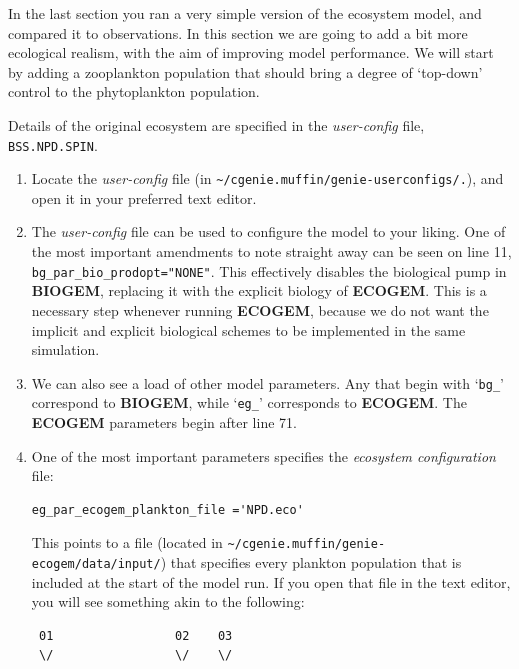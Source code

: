 \documentclass[11pt,fleqn]{book} %
\begin{document}
In the last section you ran a very simple version of the ecosystem model, and compared it to observations. In this section we are going to add a bit more ecological realism, with the aim of improving model performance. We will start by adding a zooplankton population that  should bring a degree of `top-down' control to the phytoplankton population. 
\vspace{2mm}

Details of the original ecosystem are specified in the \textit{user-config} file, \texttt{BSS.NPD.SPIN}.

\vspace{2mm}
\begin{enumerate}[noitemsep]

\item Locate the \textit{user-config} file (in \texttt{\textasciitilde{}/cgenie.muffin/genie-userconfigs/.}), and open it in your preferred text editor.

\item The \textit{user-config} file can be used to configure the model to your liking. One of the most important amendments to note straight away can be seen on line 11, \texttt{bg\_par\_bio\_prodopt="NONE"}. This effectively disables the biological pump in \textbf{BIOGEM}, replacing it with the explicit biology of \textbf{ECOGEM}. This is a necessary step whenever running \textbf{ECOGEM}, because we do not want the implicit and explicit biological schemes to be implemented in the same simulation.

\item We can also see a load of other model parameters. Any that begin with `\texttt{bg\_}' correspond to \textbf{BIOGEM}, while `\texttt{eg\_}' corresponds to \textbf{ECOGEM}. The \textbf{ECOGEM} parameters begin after line 71.

\item One of the most important parameters specifies the \textit{ecosystem configuration} file:
\small\begin{verbatim}
eg_par_ecogem_plankton_file ='NPD.eco'
\end{verbatim}\normalsize
This points to a file (located in \texttt{\textasciitilde{}/cgenie.muffin/genie-ecogem/data/input/}) that specifies every plankton population that is included at the start of the model run. If you open that file in the text editor, you will see something akin to the following:
\scriptsize\begin{verbatim}
 01                 02    03
 \/                 \/    \/


\end{verbatim}
\end{enumerate}
\end{document}
